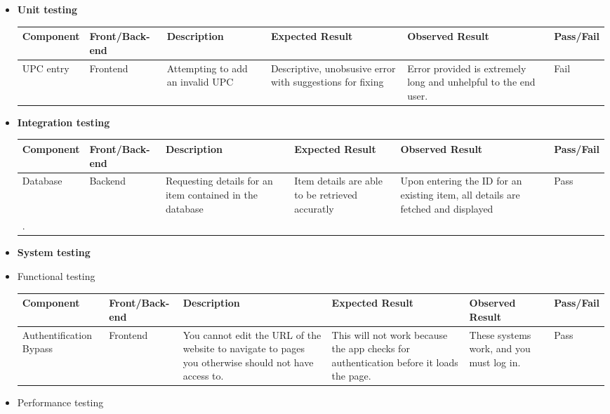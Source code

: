 \begin{center}
\begin{itemize}
\item
  \textbf{Unit testing}\\
\begin{tabular}{|p{1.9cm}|p{1.9cm}|p{1.9cm}|p{1.9cm}|p{1.9cm}|p{1.9cm}|}\hline
Component & Front/Back-end & Description & Expected Result & Observed Result & Pass/Fail\\ \hline
UPC entry & Frontend & Attempting to add an invalid UPC & Descriptive, unobsusive error with suggestions for fixing & Error provided is extremely long and unhelpful to the end user. & Fail \\ \hline

\end{tabular}

\item
  \textbf{Integration testing}\\
  \begin{tabular}{|p{1.9cm}|p{1.9cm}|p{1.9cm}|p{1.9cm}|p{1.9cm}|p{1.9cm}|}\hline
  Component & Front/Back-end & Description & Expected Result & Observed Result & Pass/Fail\\ \hline
  Database & Backend & Requesting details for an item contained in the database & Item details are able to be retrieved accuratly & Upon entering the ID for an existing item, all details are fetched and displayed & Pass \\ \hline.
  \end{tabular}
\item
  \textbf{System testing}
\item
  Functional testing\\
  \begin{tabular}{|p{1.9cm}|p{1.9cm}|p{1.9cm}|p{1.9cm}|p{1.9cm}|p{1.9cm}|}\hline
  Component & Front/Back-end & Description & Expected Result & Observed Result & Pass/Fail\\ \hline
  Authentification Bypass & Frontend & You cannot edit the URL of the website to navigate to pages you otherwise should not have access to. & This will not work because the app checks for authentication before it loads the page. & These systems work, and you must log in. & Pass \\ \hline
  \end{tabular}
\item
  Performance testing\\
  \begin{tabular}{|p{1.9cm}|p{1.9cm}|p{1.9cm}|p{1.9cm}|p{1.9cm}|p{1.9cm}|}\hline

\end{tabular}
\end{itemize}
\end{center}
